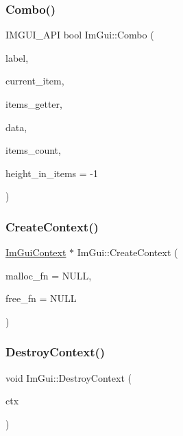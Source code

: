 \subsubsection{\texorpdfstring{Combo()}{Combo()}\hspace{0.1cm}{\footnotesize\ttfamily [3/3]}}
{\footnotesize\ttfamily I\+M\+G\+U\+I\+\_\+\+A\+PI bool Im\+Gui\+::\+Combo (\begin{DoxyParamCaption}\item[{const char $\ast$}]{label,  }\item[{int $\ast$}]{current\+\_\+item,  }\item[{bool($\ast$)(void $\ast$data, int idx, const char $\ast$$\ast$out\+\_\+text)}]{items\+\_\+getter,  }\item[{void $\ast$}]{data,  }\item[{int}]{items\+\_\+count,  }\item[{int}]{height\+\_\+in\+\_\+items = {\ttfamily -\/1} }\end{DoxyParamCaption})}

\hypertarget{namespace_im_gui_a98a4fecf50da4fb3489cee71a72cc577}{}\label{namespace_im_gui_a98a4fecf50da4fb3489cee71a72cc577} 
\subsubsection{\texorpdfstring{Create\+Context()}{CreateContext()}}
{\footnotesize\ttfamily \hyperlink{struct_im_gui_context}{Im\+Gui\+Context} $\ast$ Im\+Gui\+::\+Create\+Context (\begin{DoxyParamCaption}\item[{void $\ast$($\ast$)(size\+\_\+t)}]{malloc\+\_\+fn = {\ttfamily NULL},  }\item[{void($\ast$)(void $\ast$)}]{free\+\_\+fn = {\ttfamily NULL} }\end{DoxyParamCaption})}

\hypertarget{namespace_im_gui_a344adba8bd84069dc7425b88306411c7}{}\label{namespace_im_gui_a344adba8bd84069dc7425b88306411c7} 
\subsubsection{\texorpdfstring{Destroy\+Context()}{DestroyContext()}}
{\footnotesize\ttfamily void Im\+Gui\+::\+Destroy\+Context (\begin{DoxyParamCaption}\item[{\hyperlink{struct_im_gui_context}{Im\+Gui\+Context} $\ast$}]{ctx }\end{DoxyParamCaption})}

